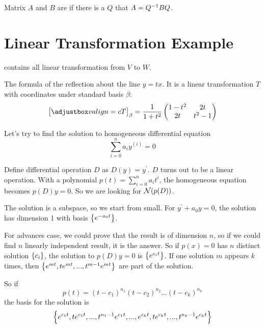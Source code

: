 \begin{definition}[similar]
    Matrix $A$ and $B$ are  if there is a $Q$ that $A = {Q}^{-1} B Q$.    
\end{definition}


%
%
%
%

\section{Linear Transformation Example}


\begin{definition}
	 contains all linear transformation from $V$ to $W$.
\end{definition}

\begin{example}
    The formula of the reflection about the line $y=tx$. It is a linear transformation $T$ with coordinates under standard basis $\beta$:
    \begin{equation*}
        \coordinate{T}_\beta = \frac{1}{1 + t^2} \begin{pmatrix}
            1-t^2 & 2t \\
            2t & t^2 -1
        \end{pmatrix}
    \end{equation*}
\end{example}


\begin{example}
    Let's try to find the solution to homogeneous differential equation 
    \begin{equation*}
        \sum_{i=0}^n a_i y^{(i)} = 0
    \end{equation*}
    
    Define differential operation $D$ as $D(y) = y^\prime$. $D$ turns out to be a linear operation. With a polynomial $p(t) = \sum_{i=0}^n a_i t^i$, the homogeneous equation becomes $p(D)y = 0$. So we are looking for $\mathcal{N}(p(D))$.
    
    The solution is a subspace, so we start from small. For $y^\prime + a_0 y = 0$, the solution has dimension 1 with basis $\set{e^{-a_0 t}}$.
    
    For advances case, we could prove that the result is of dimension $n$, so if we could find $n$ linearly independent result, it is the answer. So if $p(x) = 0$ has $n$ distinct solution $\set{c_i}$, the solution to $p(D)y = 0$ is $\set{e^{c_i t}}$. If one solution $m$ appears $k$ times, then $\set{e^{mt}, t e^{mt}, ..., t^{m-1} e^{mt}}$ are part of the solution. 
    
    So if 
    \begin{equation*}
        p(t) = (t-c_1)^{n_1} (t-c_2)^{n_2} \hdots (t-c_k)^{n_k} 
    \end{equation*}
    the basis for the solution is 
    \begin{equation*}
        \set{e^{c_1 t}, t e^{c_1 t}, ... , t^{n_1 -1} e^{c_1 t}, ... ,  e^{c_k t}, t e^{c_k t}, ..., t^{n_k -1} e^{c_k t}}
    \end{equation*}
\end{example}

